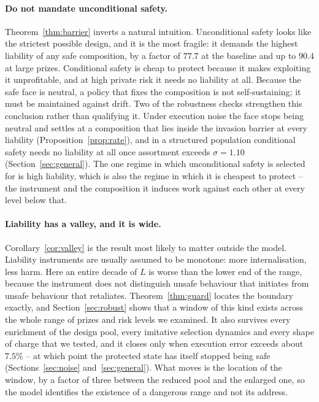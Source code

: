 \documentclass[pdflatex]{sn-jnl}
\theoremstyle{thmstyleone}
\theoremstyle{thmstylethree}
\theoremstyle{thmstyletwo}
\begin{document}
\paragraph{Do not mandate unconditional safety.}
Theorem~\ref{thm:barrier} inverts a natural intuition. Unconditional safety
looks like the strictest possible design, and it is the most fragile: it
demands the highest liability of any safe composition, by a factor of $77.7$
at the baseline and up to $90.4$ at large prizes. Conditional safety is cheap to
protect because it makes exploiting it unprofitable, and at high private risk
it needs no liability at all. Because the safe face is neutral, a policy that
fixes the composition is not self-sustaining; it must be maintained against
drift. Two of the robustness checks strengthen this conclusion rather than
qualifying it. Under execution noise the face stops being neutral and settles
at a composition that lies inside the invasion barrier at every liability
(Proposition~\ref{prop:rate}), and in a structured population conditional
safety needs no liability at all once assortment exceeds $\sigma=1.10$
(Section~\ref{sec:general}). The one regime in which unconditional safety is
selected for is high liability, which is also the regime in which it is
cheapest to protect -- the instrument and the composition it induces work
against each other at every level below that.

\paragraph{Liability has a valley, and it is wide.}
Corollary~\ref{cor:valley} is the result most likely to matter outside the
model. Liability instruments are usually assumed to be monotone: more
internalisation, less harm. Here an entire decade of $L$ is worse than the
lower end of the range, because the instrument does not distinguish unsafe
behaviour that initiates from unsafe behaviour that retaliates.
Theorem~\ref{thm:guard} locates the boundary exactly, and
Section~\ref{sec:robust} shows that a window of this kind exists across the
whole range of prizes and risk levels we examined. It also survives every
enrichment of the design pool, every imitative selection dynamics and every
shape of charge that we tested, and it closes only when execution error
exceeds about $7.5\%$ -- at which point the protected state has itself stopped
being safe (Sections~\ref{sec:noise} and~\ref{sec:general}). What moves is the
location of the window, by a factor of three between the reduced pool and the
enlarged one, so the model identifies the existence of a dangerous range and
not its address.
\end{document}
